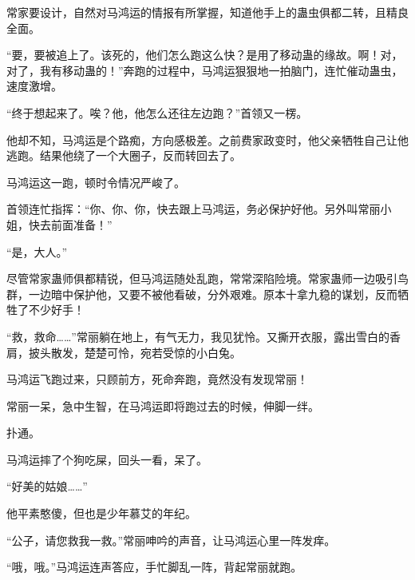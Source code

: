 \begin{this_body}
常家要设计，自然对马鸿运的情报有所掌握，知道他手上的蛊虫俱都二转，且精良全面。

“要，要被追上了。该死的，他们怎么跑这么快？是用了移动蛊的缘故。啊！对，对了，我有移动蛊的！”奔跑的过程中，马鸿运狠狠地一拍脑门，连忙催动蛊虫，速度激增。

“终于想起来了。唉？他，他怎么还往左边跑？”首领又一楞。

他却不知，马鸿运是个路痴，方向感极差。之前费家政变时，他父亲牺牲自己让他逃跑。结果他绕了一个大圈子，反而转回去了。

马鸿运这一跑，顿时令情况严峻了。

首领连忙指挥：“你、你、你，快去跟上马鸿运，务必保护好他。另外叫常丽小姐，快去前面准备！”

“是，大人。”

尽管常家蛊师俱都精锐，但马鸿运随处乱跑，常常深陷险境。常家蛊师一边吸引鸟群，一边暗中保护他，又要不被他看破，分外艰难。原本十拿九稳的谋划，反而牺牲了不少好手！

“救，救命……”常丽躺在地上，有气无力，我见犹怜。又撕开衣服，露出雪白的香肩，披头散发，楚楚可怜，宛若受惊的小白兔。

马鸿运飞跑过来，只顾前方，死命奔跑，竟然没有发现常丽！

常丽一呆，急中生智，在马鸿运即将跑过去的时候，伸脚一绊。

扑通。

马鸿运摔了个狗吃屎，回头一看，呆了。

“好美的姑娘……”

他平素憨傻，但也是少年慕艾的年纪。

“公子，请您救我一救。”常丽呻吟的声音，让马鸿运心里一阵发痒。

“哦，哦。”马鸿运连声答应，手忙脚乱一阵，背起常丽就跑。

\end{this_body}

